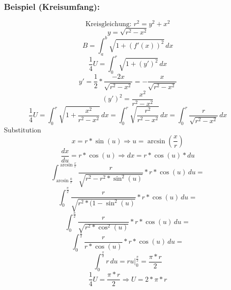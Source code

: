 \documentclass[11pt]{amsart}
\theoremstyle{remark}
\begin{document}
\subsubsection*{Beispiel (Kreisumfang):}
\begin{equation*}
	\text{Kreisgleichung: } r^2 = y^2+x^2
\end{equation*}
\begin{equation*}
	y = \sqrt {r^2-x^2}
\end{equation*}
\begin{equation*}
	B = \int_a^b \sqrt { 1 +  (f'(x))^2} \,dx
\end{equation*}
\begin{equation*}
	\frac 14 U = \int_0^r \sqrt { 1 +  (y')^2} \,dx
\end{equation*}
\begin{equation*}
	y' = \frac 12 * \frac {-2x}{\sqrt{r^2-x^2}} = - \frac {x}{\sqrt{r^2-x^2}}
\end{equation*}
\begin{equation*}
	(y')^2 = \frac {x^2}{r^2-x^2}
\end{equation*}
\begin{equation*}
	\frac 14 U =\int_0^r \sqrt{ 1+\frac {x^2}{r^2-x^2} }\,dx = \int_0^r \sqrt{ \frac {r^2}{r^2-x^2} }\,dx = \int_0^r \frac{r}{\sqrt{r^2-x^2}}\,dx
\end{equation*}
\newline Substitution
\begin{equation*}
	x = r * \sin (u) \Rightarrow u = \arcsin \left( \frac xr\right)
\end{equation*}
\begin{equation*}
	\frac{dx}{du} = r * \cos (u) \Rightarrow dx = r*\cos (u) * du
\end{equation*}
\begin{equation*}
	\int_{\arcsin \frac 0r}^{\arcsin \frac rr} \frac r{\sqrt{r^2-r^2* \sin^2 (u)}} * r *\cos (u) \,du =
\end{equation*}
\begin{equation*}
	\int_{0}^{\frac \pi2} \frac r{\sqrt{r^2*(1- \sin^2 (u)}} * r *\cos (u) \,du =
\end{equation*}
\begin{equation*}
	\int_{0}^{\frac \pi2} \frac r{\sqrt{r^2*\cos^2 (u)}} * r *\cos (u) \,du =
\end{equation*}
\begin{equation*}
	\int_{0}^{\frac \pi2} \frac r{r*\cos (u)} * r *\cos (u) \,du =
\end{equation*}
\begin{equation*}
	\int_{0}^{\frac \pi2} r \,du = ru \vert_0^{\frac \pi2} = \frac {\pi*r}2
\end{equation*}
\begin{equation*}
	\frac 14 U =  \frac {\pi*r}2 \Rightarrow U = 2*\pi*r
\end{equation*}
\end{document}
